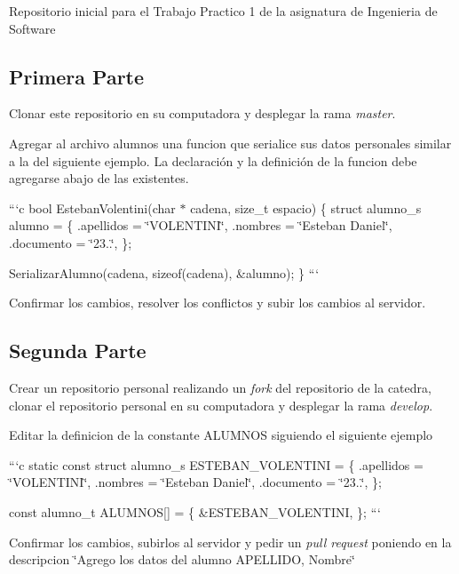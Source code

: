 Repositorio inicial para el Trabajo Practico 1 de la asignatura de Ingenieria de Software

\subsection*{Primera Parte}


\begin{DoxyEnumerate}
\item Clonar este repositorio en su computadora y desplegar la rama {\itshape master}.
\item Agregar al archivo alumnos una funcion que serialice sus datos personales similar a la del siguiente ejemplo. La declaración y la definición de la funcion debe agregarse abajo de las existentes.

```c bool Esteban\+Volentini(char $\ast$ cadena, size\+\_\+t espacio) \{ struct alumno\+\_\+s alumno = \{ .apellidos = \char`\"{}\+V\+O\+L\+E\+N\+T\+I\+N\+I\char`\"{}, .nombres = \char`\"{}\+Esteban Daniel\char`\"{}, .documento = \char`\"{}23..\char`\"{}, \};

Serializar\+Alumno(cadena, sizeof(cadena), \&alumno); \} ```
\item Confirmar los cambios, resolver los conflictos y subir los cambios al servidor.
\end{DoxyEnumerate}

\subsection*{Segunda Parte}


\begin{DoxyEnumerate}
\item Crear un repositorio personal realizando un {\itshape fork} del repositorio de la catedra, clonar el repositorio personal en su computadora y desplegar la rama {\itshape develop}.
\item Editar la definicion de la constante A\+L\+U\+M\+N\+OS siguiendo el siguiente ejemplo

```c static const struct alumno\+\_\+s E\+S\+T\+E\+B\+A\+N\+\_\+\+V\+O\+L\+E\+N\+T\+I\+NI = \{ .apellidos = \char`\"{}\+V\+O\+L\+E\+N\+T\+I\+N\+I\char`\"{}, .nombres = \char`\"{}\+Esteban Daniel\char`\"{}, .documento = \char`\"{}23..\char`\"{}, \};

const alumno\+\_\+t A\+L\+U\+M\+N\+OS\mbox{[}\mbox{]} = \{ \&E\+S\+T\+E\+B\+A\+N\+\_\+\+V\+O\+L\+E\+N\+T\+I\+NI, \}; ```
\item Confirmar los cambios, subirlos al servidor y pedir un {\itshape pull request} poniendo en la descripcion \char`\"{}\+Agrego los datos del alumno A\+P\+E\+L\+L\+I\+D\+O, Nombre\char`\"{}
\end{DoxyEnumerate}


